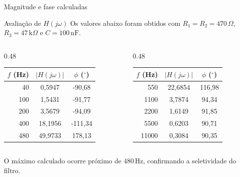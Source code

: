\begin{frame}{Magnitude e fase calculadas}
  \small
  \begin{block}{Avaliação de $H(j\omega)$}
    Os valores abaixo foram obtidos com $R_1=R_2=470\,\Omega$,
    $R_3=47\,\mathrm{k}\Omega$ e $C=100\,\mathrm{nF}$.
  \end{block}

  \begin{columns}[T,onlytextwidth]
    \begin{column}{0.48\textwidth}
      \centering
      \begin{tabular}{rcc}
        \toprule
        $f$ (Hz) & $|H(j\omega)|$ & $\phi$ ($^\circ$) \\
        \midrule
        40  & 0,5947  & -90,68 \\
        100 & 1,5431  & -91,77 \\
        200 & 3,5679  & -94,09 \\
        400 & 18,1956 & -111,34 \\
        480 & 49,9733 & 178,13 \\
        \bottomrule
      \end{tabular}
    \end{column}
    \begin{column}{0.48\textwidth}
      \centering
      \begin{tabular}{rcc}
        \toprule
        $f$ (Hz) & $|H(j\omega)|$ & $\phi$ ($^\circ$) \\
        \midrule
        550   & 22,6854 & 116,98 \\
        1100  & 3,7874  & 94,34 \\
        2200  & 1,6149  & 91,85 \\
        5500  & 0,6203  & 90,71 \\
        11000 & 0,3084  & 90,35 \\
        \bottomrule
      \end{tabular}
    \end{column}
  \end{columns}

  \vspace{0.30cm}
  \centering
  \alert{O máximo calculado ocorre próximo de $480\,\mathrm{Hz}$, confirmando a seletividade do filtro.}
\end{frame}